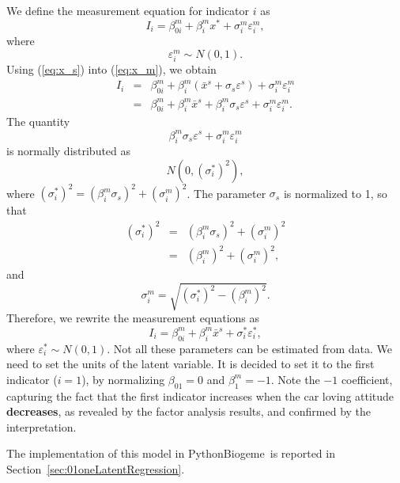 \documentclass[12pt,a4paper]{article}
\newcommand{\req}[1]{(\ref{#1})}
\newcommand{\PBIOGEME}{PythonBiogeme}
\begin{document}
We define the measurement equation for indicator $i$ as 
\begin{equation}
\label{eq:x_m}
I_i =  \beta_{0i}^m +\beta^m_i x^* + \sigma^m_i \varepsilon^{m}_i,
\end{equation}
where 
\begin{equation}
\varepsilon^{m}_i \sim N(0,1).
\end{equation}
Using \req{eq:x_s} into \req{eq:x_m}, we obtain
\begin{equation}
\begin{array}{rcl}
I_i &=&  \beta_{0i}^m +\beta^m_i (\bar{x}^s + \sigma_s
\varepsilon^s)  + \sigma^m_i \varepsilon^{m}_i \\
  &=&  \beta_{0i}^m +\beta^m_i \bar{x}^s + \beta^m_i\sigma_s\varepsilon^s +  \sigma^m_i\varepsilon^{m}_i.
\end{array}
\end{equation}
The quantity
\begin{equation}
 \beta^m_i\sigma_s\varepsilon^s +  \sigma^m_i\varepsilon^{m}_i
\end{equation}
 is  normally distributed as
\begin{equation}
N\left(0,(\sigma_i^*)^2\right),
\end{equation}
where $(\sigma_i^*)^2 =(\beta^m_i\sigma_s)^2 +(\sigma^m_i)^2$. The parameter $\sigma_s$ is
normalized to 1, so that
\[
\begin{array}{rcl} 
(\sigma_i^*)^2 & =&(\beta^m_i\sigma_s)^2 +(\sigma^m_i)^2 \\
               & =&(\beta^m_i)^2 +(\sigma^m_i)^2,
\end{array}
\]
and
 \[
\sigma^m_i = \sqrt{(\sigma_i^*)^2 - (\beta^m_i)^2}.
\]
 Therefore, we rewrite the
measurement equations as 
\begin{equation}
\label{eq:measurementCoded}
I_i =  \beta_{0i}^m +\beta^m_i \bar{x}^s + \sigma^*_i \varepsilon_i^*,
\end{equation}
where $\varepsilon_i^* \sim N(0,1)$.
Not all these parameters can be estimated from data. We need to set
the units of the  latent variable. It is decided to set it to the
first indicator ($i=1$), by normalizing
  $\beta_{01}=0$ and $\beta^m_1 = -1$. 
Note the $-1$ coefficient, capturing the fact that the first indicator
increases when the car loving attitude \textbf{decreases}, as revealed
by the factor analysis results, and confirmed by the interpretation. 

The implementation of this model in \PBIOGEME\ is reported in
Section~\ref{sec:01oneLatentRegression}. 
\end{document}
